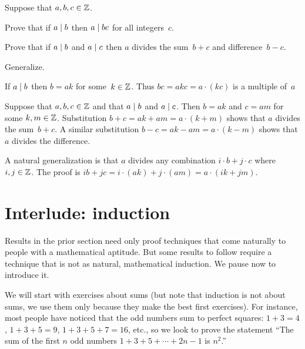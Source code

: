 \documentclass{ibl}
\begin{document}
\begin{ex}
Suppose that $a,b,c\in\mathbb{Z}$.
\begin{exes}
\item Prove that if $a\mid b$ then $a\mid bc$ for all integers~$c$.
\item Prove that if $a\mid b$ and $a\mid c$ then $a$ divides the 
  sum~$b+c$ and difference~$b-c$.
\item Generalize.
\end{exes}
\begin{ans}
\begin{exes}
\item If $a\mid b$ then $b=ak$ for some~$k\in\mathbb{Z}$.
  Thus $bc=akc=a\cdot(kc)$ is a multiple of~$a$
\item Suppose that $a,b,c\in\mathbb{Z}$ and that $a\mid b$ and $a\mid c$.
  Then $b=ak$ and $c=am$ for some $k,m\in\mathbb{Z}$. 
  Substitution  
  $b+c=ak+am=a\cdot(k+m)$
  shows that $a$ divides the sum~$b+c$.
  A similar substitution
  $b-c=ak-am=a\cdot(k-m)$
  shows that $a$ divides the difference.
\item A natural generalization is that $a$ divides any combination
  $i\cdot b+j\cdot c$ where $i,j\in\mathbb{Z}$.
  The proof is
  $ib+jc=i\cdot (ak)+j\cdot(am)=a\cdot(ik+jm)$.
\end{exes}
\end{ans}
\end{ex}




\section{Interlude: induction}
Results in the prior section need only proof techniques that come naturally
to people with a mathematical aptitude.
But some results to follow require a technique 
that is not as natural, mathematical induction.
We pause now to introduce it.

We will start with exercises about sums 
(but note that induction is not about sums,
we use them only because they make the best first exercises).
For instance, most people have noticed that the odd numbers sum to 
perfect squares: $1+3=4$, $1+3+5=9$, $1+3+5+7=16$, etc.,
so we look to prove 
the statement 
``The sum of the first $n$ odd numbers $1+3+5+\cdots+2n-1$ is $n^2$.'' 
\end{document}
